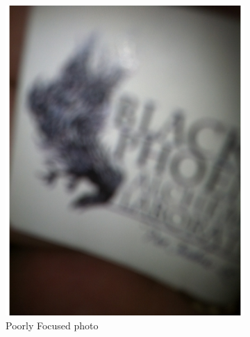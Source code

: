 \documentclass[sigconf]{acmart}
\begin{document}
\begin{figure}[hbp]
\begin{subfigure}[b]{0.3\columnwidth}
                \includegraphics[width=\textwidth]{images/poor_f.pdf}
                \caption{Poorly Focused photo}
                \label{fig:pf}
        \end{subfigure}%
        \begin{subfigure}[b]{0.3\columnwidth}

\end{subfigure}
\end{figure}
\end{document}
